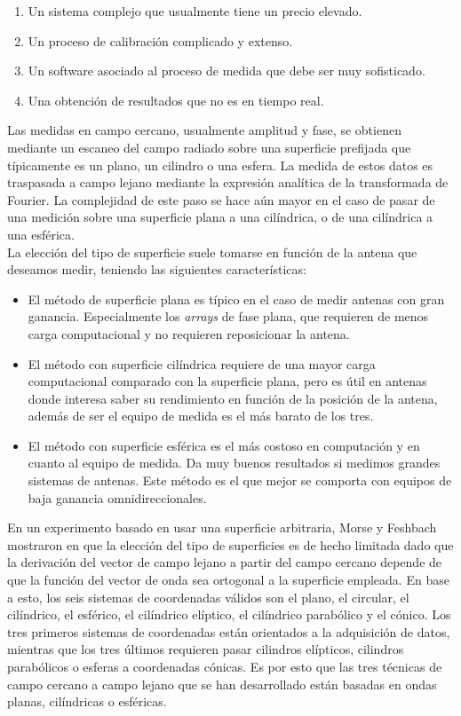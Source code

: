 \begin{enumerate}
    \item Un sistema complejo que usualmente tiene un precio elevado.
    \item Un proceso de calibración complicado y extenso.
    \item Un software asociado al proceso de medida que debe ser muy sofisticado.
   \item  Una obtención de resultados que no es en tiempo real.
\end{enumerate}

\noindent
Las medidas en campo cercano, usualmente amplitud y fase, se obtienen mediante un escaneo del campo radiado sobre una superficie prefijada que típicamente es un plano, un cilindro o una esfera. La medida de estos datos es traspasada a campo lejano mediante la expresión analítica de la transformada de Fourier. La complejidad de este paso se hace aún mayor en el caso de pasar de una medición sobre una superficie plana a una cilíndrica, o de una cilíndrica a una esférica.\\

La elección del tipo de superficie suele tomarse en función de la antena que deseamos medir, teniendo las siguientes características:

\begin{itemize}
    \item El método de superficie plana es típico en el caso de medir antenas con gran ganancia. Especialmente los \textit{arrays} de fase plana, que requieren de menos carga computacional y no requieren reposicionar la antena.
    \item El método con superficie cilíndrica requiere de una mayor carga computacional comparado con la superficie plana, pero es útil en antenas donde interesa saber su rendimiento en función de la posición de la antena, además de ser el equipo de medida es el más barato de los tres.
    \item El método con superficie esférica es el más costoso en computación y en cuanto al equipo de medida. Da muy buenos resultados si medimos grandes sistemas de antenas. Este método es el que mejor se comporta con equipos de baja ganancia omnidireccionales.
\end{itemize}

\newpage

En un experimento basado en usar una superficie arbitraria, Morse y Feshbach mostraron en \cite{morse&Feshbach1953} que la elección del tipo de superficies es de hecho limitada dado que la derivación del vector de campo lejano a partir del campo cercano depende de que la función del vector de onda sea ortogonal a la superficie empleada. En base a esto, los seis sistemas de coordenadas válidos son el plano, el circular, el cilíndrico, el esférico, el cilíndrico elíptico, el cilíndrico parabólico y el cónico. Los tres primeros sistemas de coordenadas están orientados a la adquisición de datos, mientras que los tres últimos requieren pasar cilindros elípticos, cilindros parabólicos o esferas a coordenadas cónicas. Es por esto que las tres técnicas de campo cercano a campo lejano que se han desarrollado están basadas en ondas planas, cilíndricas o esféricas.\\

